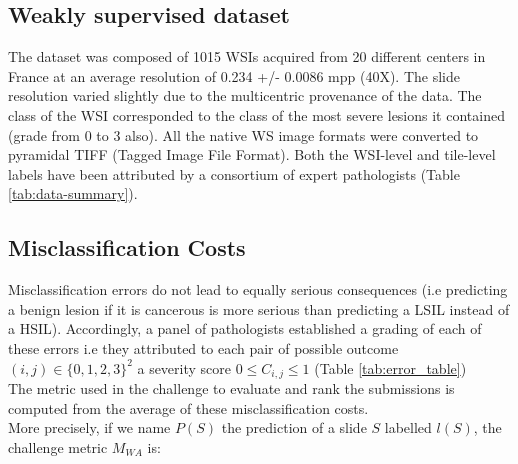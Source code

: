 \begin{table}[h]
\centering
{}
\caption{Dataset Summary}
\label{tab:data-summary}
\end{table}

\subsection{Weakly supervised dataset}
The dataset was composed of 1015 WSIs acquired from 20 different centers in France at an average resolution of 0.234 +/- 0.0086 mpp (40X). The slide resolution varied slightly due to the multicentric provenance of the data. The class of the WSI corresponded to the class of the most severe lesions it contained (grade from 0 to 3 also). All the native WS image formats were converted to pyramidal TIFF (Tagged Image File Format).
Both the WSI-level and tile-level labels have been attributed by a consortium of expert pathologists (Table \ref{tab:data-summary}).

\subsection{Misclassification Costs}

Misclassification errors do not lead to equally serious consequences (i.e predicting a benign lesion if it is cancerous is more serious than predicting a LSIL instead of a HSIL). Accordingly, a panel of pathologists established a grading of each of these errors i.e they attributed to each pair of possible outcome $(i,j) \in \{0, 1, 2, 3\}^{2}$ a severity score 
$0  \leqslant C_{i, j}  \leqslant 1$ (Table \ref{tab:error_table})  \\
The metric used in the challenge to evaluate and rank the submissions is computed from the average of these misclassification costs.\\
More precisely, if we name $P(S)$ the prediction of a slide $S$ labelled $l(S)$, the challenge metric $M_{WA}$ is: \\

